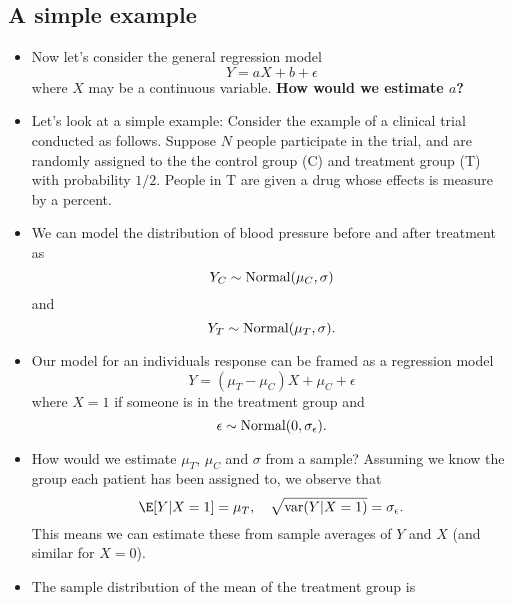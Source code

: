 \subsection{A simple example}
\begin{itemize}
\item Now let's consider the general regression model
\begin{equation}
Y = aX + b + \epsilon 
\end{equation}
where $X$ may be a continuous variable. 
{\bf How would we estimate $a$? }
\item Let's look at a simple example: 
Consider the example of a clinical trial conducted as follows. Suppose $N$ people participate in the trial, and are randomly assigned to the the control group (C) and treatment group (T) with probability $1/2$. People in T are given a drug whose effects is measure by a percent.  
\item We can model the distribution of blood pressure before and after treatment as 
\begin{equation}
Y_C \sim {\rm Normal}(\mu_C,\sigma)
\end{equation}
and 
\begin{equation}
Y_T \sim {\rm Normal}(\mu_T,\sigma).
\end{equation}
\item Our model for an individuals response can be framed as a regression model 
\begin{equation}\label{eq:clinical}
Y  = (\mu_T-\mu_C)X + \mu_C + \epsilon
\end{equation}
where $X=1$ if someone is in the treatment group and 
\begin{equation}
\epsilon \sim {\rm Normal}(0,\sigma_{\epsilon}). 
\end{equation}
\item How would we estimate $\mu_T$, $\mu_C$ and $\sigma$ from a sample? Assuming we know the group each patient has been assigned to, we observe that 
\begin{equation}
\E[Y|X=1] = \mu_T,\quad  \sqrt{{\rm var}(Y|X=1)} = \sigma_{\epsilon}. 
\end{equation}
This means we can estimate these from sample averages of $Y$ and $X$ (and similar for $X=0$).
\item The sample distribution of the mean of the treatment group is

\end{itemize}

